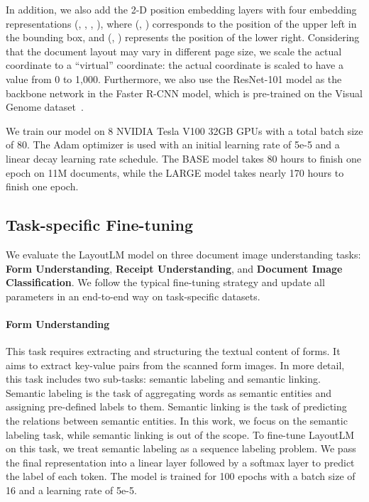 \documentclass[sigconf]{acmart}
\begin{document}
In addition, we also add the 2-D position embedding layers with four embedding representations (, , , ), where (, ) corresponds to the position of the upper left in the bounding box, and (, ) represents the position of the lower right. Considering that the document layout may vary in different page size, we scale the actual coordinate to a ``virtual'' coordinate: the actual coordinate is scaled to have a value from 0 to 1,000. Furthermore, we also use the ResNet-101 model as the backbone network in the Faster R-CNN model, which is pre-trained on the Visual Genome dataset~\citep{krishnavisualgenome}.

We train our model on 8 NVIDIA Tesla V100 32GB GPUs with a total batch size of 80. The Adam optimizer is used with an initial learning rate of 5e-5 and a linear decay learning rate schedule. The BASE model takes 80 hours to finish one epoch on 11M documents, while the LARGE model takes nearly 170 hours to finish one epoch.

\subsection{Task-specific Fine-tuning}
We evaluate the LayoutLM model on three document image understanding tasks: \textbf{Form Understanding}, \textbf{Receipt Understanding}, and \textbf{Document Image Classification}. We follow the typical fine-tuning strategy and update all parameters in an end-to-end way on task-specific datasets.

\paragraph{Form Understanding}
This task requires extracting and structuring the textual content of forms. It aims to extract key-value pairs from the scanned form images. In more detail, this task includes two sub-tasks: semantic labeling and semantic linking. Semantic labeling is the task of aggregating words as semantic entities and assigning pre-defined labels to them. Semantic linking is the task of predicting the relations between semantic entities. In this work, we focus on the semantic labeling task, while semantic linking is out of the scope.  To fine-tune LayoutLM on this task, we treat semantic labeling as a sequence labeling problem. We pass the final representation into a linear layer followed by a softmax layer to predict the label of each token. The model is trained for 100 epochs with a batch size of 16 and a learning rate of 5e-5. 
\end{document}
